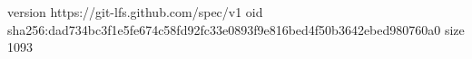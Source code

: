 version https://git-lfs.github.com/spec/v1
oid sha256:dad734bc3f1e5fe674c58fd92fc33e0893f9e816bed4f50b3642ebed980760a0
size 1093
